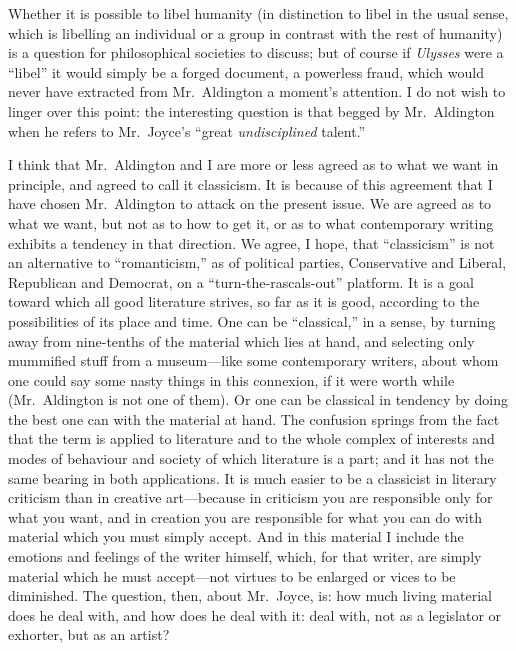 Whether it is possible to libel humanity (in distinction to libel in the
usual sense, which is libelling an individual or a group in contrast
with the rest of humanity) is a question for philosophical societies to
discuss; but of course if \emph{Ulysses} were a ``libel'' it would
simply be a forged document, a powerless fraud, which would never have
extracted from Mr.~Aldington a moment's attention. I do not wish to
linger over this point: the interesting question is that begged by
Mr.~Aldington when he refers to Mr.~Joyce's ``great \emph{undisciplined}
talent.''

I think that Mr.~Aldington and I are more or less agreed as to what we
want in principle, and agreed to call it classicism. It is because of
this agreement that I have chosen Mr.~Aldington to attack on the present
issue. We are agreed as to what we want, but not as to how to get it, or
as to what contemporary writing exhibits a tendency in that direction.
We agree, I hope, that ``classicism'' is not an alternative to
``romanticism,'' as of political parties, Conservative and Liberal,
Republican and Democrat, on a ``turn-the-rascals-out'' platform. It is a
goal toward which all good literature strives, so far as it is good,
according to the possibilities of its place and time. One can be
``classical,'' in a sense, by turning away from nine-tenths of the
material which lies at hand, and selecting only mummified stuff from a
museum---like some contemporary writers, about whom one could say some
nasty things in this connexion, if it were worth while (Mr.~Aldington is
not one of them). Or one can be classical in tendency by doing the best
one can with the material at hand. The confusion springs from the fact
that the term is applied to literature and to the whole complex of
interests and modes of behaviour and society of which literature is a
part; and it has not the same bearing in both applications. It is much
easier to be a classicist in literary criticism than in creative
art---because in criticism you are responsible only for what you want,
and in creation you are responsible for what you can do with material
which you must simply accept. And in this material I include the
emotions and feelings of the writer himself, which, for that writer, are
simply material which he must accept---not virtues to be enlarged or
vices to be diminished. The question, then, about Mr.~Joyce, is: how
much living material does he deal with, and how does he deal with it:
deal with, not as a legislator or exhorter, but as an artist?

